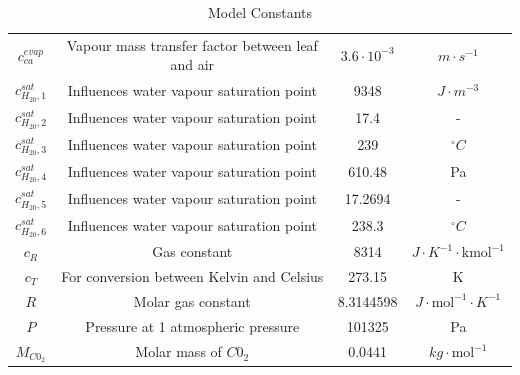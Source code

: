 \begin{table}[H]
\begin{tabular}{|c|c|c|c|}
		\\
		$c_{ca}^{evap}$&Vapour mass transfer factor between leaf and air  & $3.6 \cdot 10^{-3}$ & $m \cdot s^{-1}$
		\\
		$c_{H_20,1}^{sat}$& Influences water vapour saturation point&9348 & $J \cdot m^{-3}$
		\\
		$c_{H_20,2}^{sat}$&Influences water vapour saturation point &17.4 & -
		\\
		$c_{H_20,3}^{sat}$& Influences water vapour saturation point&239 & $^\circ C$
		\\
		$c_{H_20,4}^{sat}$& Influences water vapour saturation point&610.48 & Pa
		\\
		$c_{H_20,5}^{sat}$&Influences water vapour saturation point &17.2694 & -
		\\
		$c_{H_20,6}^{sat}$& Influences water vapour saturation point&238.3 & $^\circ C$
		\\
		$c_R$& Gas constant &8314 & $J \cdot K^{-1} \cdot \text{kmol}^{-1}$
		\\
		$c_T$& For conversion between Kelvin and Celsius &273.15 & K
		\\
		$R$&Molar gas constant &8.3144598 &$J \cdot \text{mol}^{-1} \cdot K^{-1}$
		\\
		$P$&Pressure at 1 atmospheric pressure &101325 & Pa
		\\
		$M_{C0_2}$& Molar mass of $C0_2$ &0.0441 & $kg \cdot \text{mol}^{-1}$
		\\
		\hline
	\end{tabular}
	\caption{Model Constants}
	\label{tab:model constants and descriptions}
\end{table}


